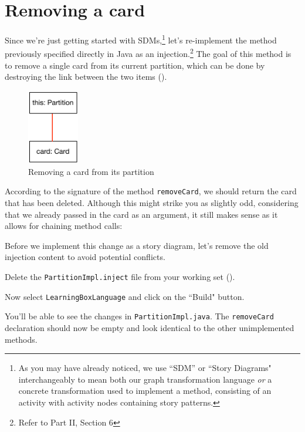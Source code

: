 \newpage
\genHeader
\section{Removing a card}
\hypertarget{sec:remCard}{}

Since we're just getting started with SDMs,\footnote{As you may have already noticed, we use ``SDM'' or ``Story Diagrams" interchangeably to mean both our graph
transformation language \emph{or} a concrete transformation used to implement a method, consisting of an activity with activity nodes containing story
patterns.} let's re-implement the method previously specified directly in Java as an injection.\footnote{Refer to Part II, Section 6} The goal of this method
is to remove a single card from its current partition, which can be done by destroying the link between the two items ().

\vspace{1cm}

\begin{figure}[htbp]
	\centering
    \includegraphics[width=0.2\textwidth]{../../org.moflon.doc.handbook.03_storyDiagrams/03_removeCard/splashImages/goal_removeCard.pdf}
	\caption{Removing a card from its partition}
	\label{fig:goal_removeCard}
\end{figure}
\FloatBarrier

\vspace{0.5cm}

According to the signature of the method \texttt{removeCard}, we should return the card that has been deleted. Although this might strike you as slightly odd,
considering that we already passed in the card as an argument, it still makes sense as it allows for chaining method calls:

Before we implement this change as a story diagram, let's remove the old injection content to avoid potential conflicts.

\begin{stepbystep}

\item Delete the \texttt{PartitionImpl.inject} file from your working set ().

\item Now select \texttt{LearningBoxLanguage} and click on the ``Build" button. 

\item You'll be able to see the changes in \texttt{PartitionImpl.java}. The \texttt{removeCard}
declaration should now be empty and look identical to the other unimplemented methods.

\end{stepbystep}

